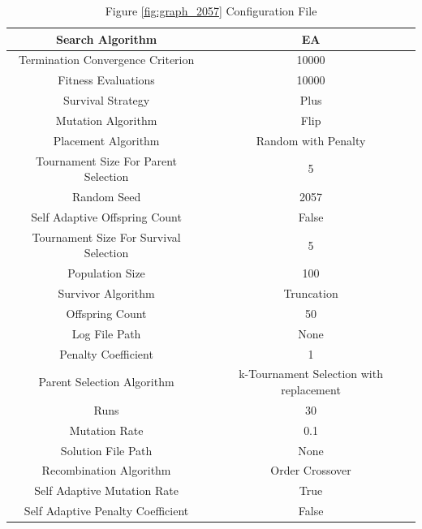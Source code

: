 \documentclass{standalone}
\begin{document}
\begin{table}[!htb]
	\centering
	\caption{Figure \ref{fig:graph_2057} Configuration File}
	\label{tab:graph_2057}
	\begin{tabular}{| c | c |}
		\hline
		Search Algorithm		& EA		 \\
		\hline
		Termination Convergence Criterion		& 10000		 \\
		\hline
		Fitness Evaluations		& 10000		 \\
		\hline
		Survival Strategy		& Plus		 \\
		\hline
		Mutation Algorithm		& Flip		 \\
		\hline
		Placement Algorithm		& Random with Penalty		 \\
		\hline
		Tournament Size For Parent Selection		& 5		 \\
		\hline
		Random Seed		& 2057		 \\
		\hline
		Self Adaptive Offspring Count		& False		 \\
		\hline
		Tournament Size For Survival Selection		& 5		 \\
		\hline
		Population Size		& 100		 \\
		\hline
		Survivor Algorithm		& Truncation		 \\
		\hline
		Offspring Count		& 50		 \\
		\hline
		Log File Path		& None		 \\
		\hline
		Penalty Coefficient		& 1		 \\
		\hline
		Parent Selection Algorithm		& k-Tournament Selection with replacement		 \\
		\hline
		Runs		& 30		 \\
		\hline
		Mutation Rate		& 0.1		 \\
		\hline
		Solution File Path		& None		 \\
		\hline
		Recombination Algorithm		& Order Crossover		 \\
		\hline
		Self Adaptive Mutation Rate		& True		 \\
		\hline
		Self Adaptive Penalty Coefficient		& False		 \\
		\hline
	\end{tabular}
\end{table}
\end{document}
